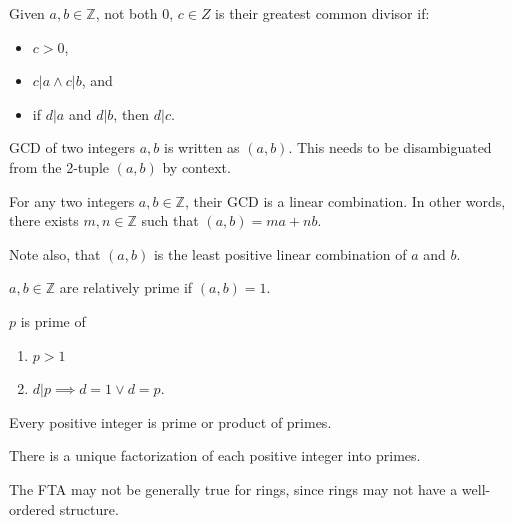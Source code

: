 \begin{definition}
	Given $a, b \in \mathbb{Z}$, not both $0$,  $c \in Z$ is their greatest common divisor if:
	\begin{itemize}
		\item $c>0$,
		\item $c|a \land  c | b $, and
		\item if $d | a$ and $d | b $, then $d | c $.
	\end{itemize}
\end{definition}
\begin{notation}
	GCD of two integers $a, b$ is written as $(a, b)$. This needs to be disambiguated from the 2-tuple $(a,b)$ by context.
\end{notation}

\begin{theorem}
	For any two integers $a,b \in \mathbb{Z}$, their GCD is a linear combination. In other words, there exists $m,n \in  \mathbb{Z}$ such that $(a,b) = ma+nb $.
\end{theorem}
Note also, that $(a,b)$ is the least positive linear combination of $a $ and $b $.

\begin{definition}
	$a,b \in \mathbb{Z}$ are relatively prime if $(a,b) = 1 $.
\end{definition}

\begin{definition}[prime]
	$p$ is prime of 
	\begin{enumerate}
		\item $p > 1$
		\item $d | p \implies d = 1 \lor d = p$.
	\end{enumerate}
\end{definition}

\begin{theorem}[1.5.7]
	Every positive integer is prime or product of primes.
\end{theorem}

\begin{theorem}
	There is a unique factorization of each positive integer into primes.
\end{theorem}
\begin{remark}
	The FTA may not be generally true for rings, since rings may not have a well-ordered structure.
\end{remark}
